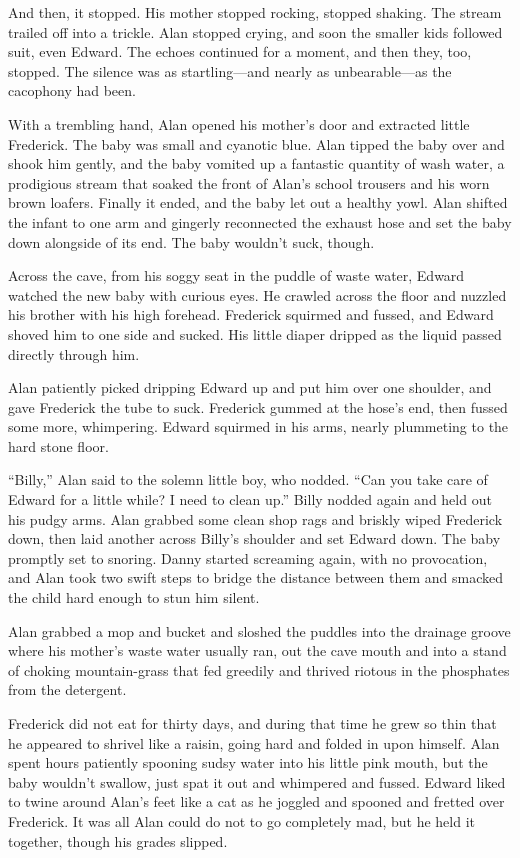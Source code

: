 And then, it stopped.  His mother stopped rocking, stopped shaking. 
The stream trailed off into a trickle.  Alan stopped crying, and soon
the smaller kids followed suit, even Edward.  The echoes continued for
a moment, and then they, too, stopped.  The silence was as
startling---and nearly as unbearable---as the cacophony had been.

With a trembling hand, Alan opened his mother's door and extracted
little Frederick.  The baby was small and cyanotic blue.  Alan tipped
the baby over and shook him gently, and the baby vomited up a
fantastic quantity of wash water, a prodigious stream that soaked the
front of Alan's school trousers and his worn brown loafers.  Finally
it ended, and the baby let out a healthy yowl.  Alan shifted the
infant to one arm and gingerly reconnected the exhaust hose and set
the baby down alongside of its end.  The baby wouldn't suck, though.

Across the cave, from his soggy seat in the puddle of waste water,
Edward watched the new baby with curious eyes.  He crawled across the
floor and nuzzled his brother with his high forehead.  Frederick
squirmed and fussed, and Edward shoved him to one side and sucked. 
His little diaper dripped as the liquid passed directly through him.

Alan patiently picked dripping Edward up and put him over one
shoulder, and gave Frederick the tube to suck.  Frederick gummed at
the hose's end, then fussed some more, whimpering.  Edward squirmed in
his arms, nearly plummeting to the hard stone floor.

``Billy,'' Alan said to the solemn little boy, who nodded.  ``Can you
take care of Edward for a little while?  I need to clean up.'' Billy
nodded again and held out his pudgy arms.  Alan grabbed some clean
shop rags and briskly wiped Frederick down, then laid another across
Billy's shoulder and set Edward down.  The baby promptly set to
snoring.  Danny started screaming again, with no provocation, and Alan
took two swift steps to bridge the distance between them and smacked
the child hard enough to stun him silent.

Alan grabbed a mop and bucket and sloshed the puddles into the
drainage groove where his mother's waste water usually ran, out the
cave mouth and into a stand of choking mountain-grass that fed
greedily and thrived riotous in the phosphates from the detergent.

Frederick did not eat for thirty days, and during that time he grew so
thin that he appeared to shrivel like a raisin, going hard and folded
in upon himself.  Alan spent hours patiently spooning sudsy water into
his little pink mouth, but the baby wouldn't swallow, just spat it out
and whimpered and fussed.  Edward liked to twine around Alan's feet
like a cat as he joggled and spooned and fretted over Frederick.  It
was all Alan could do not to go completely mad, but he held it
together, though his grades slipped.


